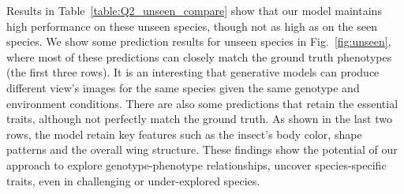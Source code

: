 Results in Table~\ref{table:Q2_unseen_compare} show that our model maintains high performance on these unseen species, though not as high as on the seen species. 
We show some prediction results for unseen species in Fig.~\ref{fig:unseen}, where most of these predictions can closely match the ground truth phenotypes (the first  three rows). It is an interesting that generative models can produce different view's images for the same species given the same genotype and environment conditions. There are also some predictions that retain the essential traits, although not perfectly match the ground truth. As shown in the last two rows, the model retain key features such as the insect's body color, shape patterns and the overall wing structure.
These findings show the potential of our approach to explore genotype-phenotype relationships, uncover species-specific traits, even in challenging or under-explored species.











